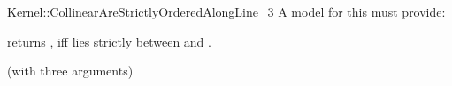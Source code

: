 \begin{ccRefFunctionObjectConcept}{Kernel::CollinearAreStrictlyOrderedAlongLine_3}
A model for this must provide:


         {returns , iff  lies strictly between 
          and . }

\ccRefines
{} (with three arguments)

\ccSeeAlso

  \\


\end{ccRefFunctionObjectConcept}
